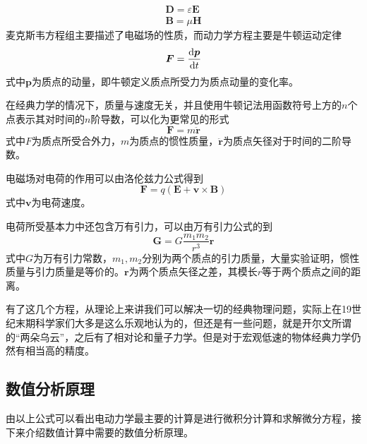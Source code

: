 \documentclass[UTF8,a4paper,10pt]{ctexart}
\begin{document}
\begin{multicols}{2}
        \begin{equation}
            \begin{array}{c}
                \bm{D} = \varepsilon\bm{E}\\
                \bm{B} = \mu\bm{H}
            \end{array}
        \end{equation}
        麦克斯韦方程组主要描述了电磁场的性质，而动力学方程主要是牛顿运动定律
        \begin{equation}
            \bm{F} = \frac{{\rm d}\bm{p}}{{\rm d}t}
        \end{equation}
        式中$\bm{p}$为质点的动量，即牛顿定义质点所受力为质点动量的变化率。\par
        在经典力学的情况下，质量与速度无关，并且使用牛顿记法用函数符号上方的$n$个点表示其对时间的$n$阶导数，可以化为更常见的形式
        \begin{equation}
            \bm{F} = m\ddot{\bm{r}}
        \end{equation}
        式中$F$为质点所受合外力，$m$为质点的惯性质量，$\ddot{\bm{r}}$为质点矢径对于时间的二阶导数。\par
        电磁场对电荷的作用可以由洛伦兹力公式得到
        \begin{equation}
            \bm{F} = q(\bm{E}+\bm{v}\times\bm{B})
        \end{equation}
        式中$\bm{v}$为电荷速度。\par
        电荷所受基本力中还包含万有引力，可以由万有引力公式的到
        \begin{equation}
            \bm{G} = G\frac{m_1m_2}{r^3}\bm{r}
        \end{equation}
        式中$G$为万有引力常数，$m_1,m_2$分别为两个质点的引力质量，大量实验证明，惯性质量与引力质量是等价的。$\bm{r}$为两个质点矢径之差，其模长$r$等于两个质点之间的距离。\par
        有了这几个方程，从理论上来讲我们可以解决一切的经典物理问题，实际上在19世纪末期科学家们大多是这么乐观地认为的，但还是有一些问题，就是开尔文所谓的“两朵乌云”，之后有了相对论和量子力学。但是对于宏观低速的物体经典力学仍然有相当高的精度。\par
        \subsection{数值分析原理}
        由以上公式可以看出电动力学最主要的计算是进行微积分计算和求解微分方程，接下来介绍数值计算中需要的数值分析原理。

\end{multicols}
\end{document}
